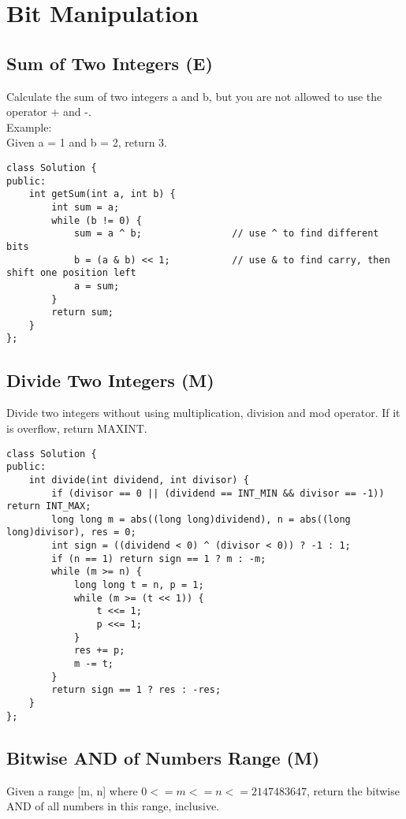 \chapter{Bit Manipulation}


\section{Sum of Two Integers (E)}
Calculate the sum of two integers a and b, but you are not allowed to use the operator + and -. \\

Example:\\
Given a = 1 and b = 2, return 3. \\

\begin{lstlisting}
class Solution {
public:
    int getSum(int a, int b) {
        int sum = a;
        while (b != 0) {
            sum = a ^ b;                // use ^ to find different bits
            b = (a & b) << 1;           // use & to find carry, then shift one position left
            a = sum;
        }
        return sum;
    }
};
\end{lstlisting}


\section{Divide Two Integers (M)}
Divide two integers without using multiplication, division and mod operator. If it is overflow, return MAXINT. \\

\begin{lstlisting}
class Solution {
public:
    int divide(int dividend, int divisor) {
        if (divisor == 0 || (dividend == INT_MIN && divisor == -1)) return INT_MAX;
        long long m = abs((long long)dividend), n = abs((long long)divisor), res = 0;
        int sign = ((dividend < 0) ^ (divisor < 0)) ? -1 : 1;
        if (n == 1) return sign == 1 ? m : -m;
        while (m >= n) {
            long long t = n, p = 1;
            while (m >= (t << 1)) {
                t <<= 1;
                p <<= 1;
            }
            res += p;
            m -= t;
        }
        return sign == 1 ? res : -res;
    }
};
\end{lstlisting}


\section{Bitwise AND of Numbers Range (M)}
Given a range [m, n] where $0 <= m <= n <= 2147483647$, return the bitwise AND of all numbers in this range, inclusive.\\

